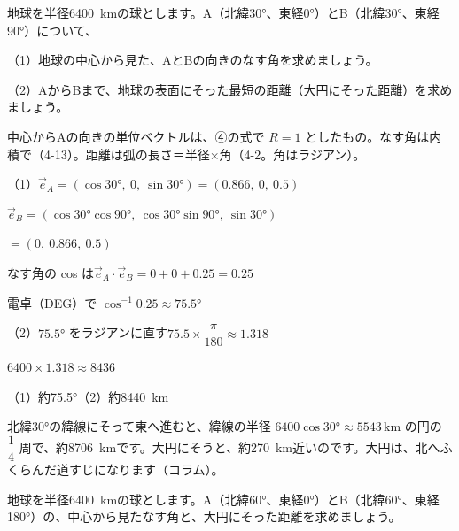 \begin{reidai}[地球の表面にそった最短の距離]
地球を半径\qty{6400}{km}の球とします。A（北緯30°、東経0°）とB（北緯30°、東経90°）について、\par
（1）地球の中心から見た、AとBの向きのなす角を求めましょう。\par
（2）AからBまで、地球の表面にそった最短の距離（大円にそった距離）を求めましょう。\par
\kangaekata 中心からAの向きの単位ベクトルは、④の式で $R=1$ としたもの。なす角は内積で（4-13）。距離は弧の長さ＝半径×角（4-2。角はラジアン）。\par
\shiki（1）$\vec e_A=(\cos30°,\ 0,\ \sin30°)=(0.866,\ 0,\ 0.5)$\par
\hspace*{4.6\zw}$\vec e_B=(\cos30°\cos90°,\ \cos30°\sin90°,\ \sin30°)$\par
\hspace*{5.6\zw}$=(0,\ 0.866,\ 0.5)$\par
\hspace*{4.6\zw}なす角の cos は\enspace $\vec e_A\cdot\vec e_B=0+0+0.25=0.25$\par
\hspace*{4.6\zw}電卓（DEG）で $\cos^{-1}0.25\approx75.5°$\par
\hspace*{2.6\zw}（2）$75.5°$ をラジアンに直す\enspace $75.5\times\dfrac{\pi}{180}\approx1.318$\par
\hspace*{4.6\zw}$6400\times1.318\approx8436$\par
\kotae （1）約75.5°\quad（2）約\qty{8440}{km}
\end{reidai}
北緯30°の緯線にそって東へ進むと、緯線の半径 $6400\cos30°\approx5543$\,km の円の $\dfrac{1}{4}$ 周で、約\qty{8706}{km}です。大円にそうと、約\qty{270}{km}近いのです。大円は、北へふくらんだ道すじになります（コラム）。

\begin{jibun}
地球を半径\qty{6400}{km}の球とします。A（北緯60°、東経0°）とB（北緯60°、東経180°）の、中心から見たなす角と、大円にそった距離を求めましょう。
\end{jibun}


